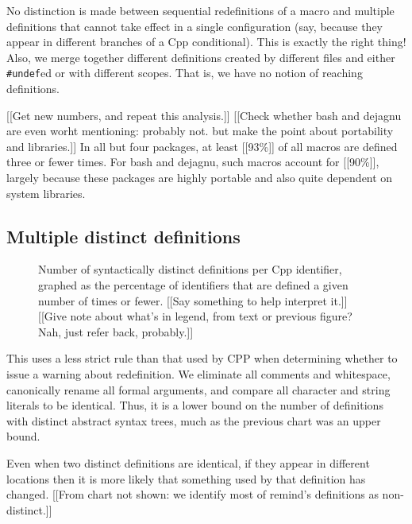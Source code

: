 \documentclass[10pt]{article}
\newcommand{\pkg}[1]{\textsf{#1}}
\begin{document}
        
        No distinction is made between sequential redefinitions of a macro
        and multiple definitions that cannot take effect in a single
        configuration (say, because they appear in different branches of a
        Cpp conditional).  This is exactly the right thing!  Also, we merge
        together different definitions created by different files and
        either {\tt \#undef}ed or with different scopes.  That is, we have
        no notion of reaching definitions.
        

        [[Get new numbers, and repeat this analysis.]]  [[Check whether
        bash and dejagnu are even worht mentioning:  probably not.  but
        make the point about portability and libraries.]]
        In all but four packages, at least [[93\%]] of all macros are
        defined three or fewer times.  For \pkg{bash} and \pkg{dejagnu},
        such macros account for [[90\%]], largely because these packages
        are highly portable and also quite dependent on system libraries.


\subsection{Multiple distinct definitions}

\begin{figure}
  \centerline{}
  \caption{Number of syntactically distinct definitions per Cpp identifier, graphed as
    the percentage of identifiers that are defined a given number of times
    or fewer.  [[Say something to help interpret it.]]  [[Give note
    about what's in legend, from text or previous figure?  Nah, just
    refer back, probably.]]}
  \label{fig:freq-ddf-cat}
\end{figure}
        
This uses a less strict rule than that used by CPP when determining whether
to issue a warning about redefinition.  We eliminate all comments and
whitespace, canonically rename all formal arguments, and compare all
character and string literals to be identical.  Thus, it is a lower bound
on the number of definitions with distinct abstract syntax trees, much as
the previous chart was an upper bound.

Even when two distinct definitions are identical, if they appear in
different locations then it is more likely that something used by that
definition has changed.  [[From chart not shown: we identify most of
\pkg{remind}'s definitions as non-distinct.]]
\end{document}
